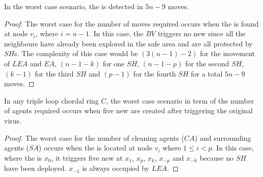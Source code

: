 \begin{theorem}
In the worst case scenario, the \bv is detected in $5n-9$ moves.
 
\end{theorem}
\begin{proof}
The worst case for the number of moves required occurs when the \bv  is found at node $v_i$, where $i=n-1$. 
  In this case, the $BV$ triggers no new \bvs since all the neighbours have already been explored in the safe area and are all protected by $SH$s.
% 
 The complexity of this case would be $(3(n-1)-2)$ for the movement of $LEA$ and $EA$, $(n-1-k)$ for one $SH$, $(n-1-p)$ for the second $SH$, $(k-1)$ for the third $SH$ and $(p-1)$ for the fourth $SH$ for a total $5n-9$ moves.
\end{proof}
\begin{theorem}
In any triple loop chordal ring $C$, the worst case scenario in term of the number of agents required occurs when five new \bvs are created after triggering the original virus.
\end{theorem}

\begin{proof}
The worst case for the number of cleaning agents ($CA$) and surrounding agents ($SA$) occurs when the \bv is located at node $v_i$ where $1 \leq i < p$. In this case, where the \bv is $x_0$, it  triggers five new \bvs at $x_1$, $x_p$, $x_k$, $x_{-p}$ and $x_{-k}$ because no $SH$ have been deployed. $x_{-1} $ is always occupied by $LEA$. %
\end{proof}



